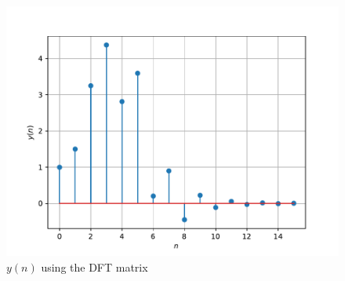 \documentclass[journal,12pt,twocolumn]{IEEEtran}
\begin{document}
\begin{figure}[!htb]
	\centering
	\includegraphics[width=\columnwidth]{figs/prob_6-5.pdf}
	\caption{$y(n)$ using the DFT matrix}
	\label{fig:yn-mtx}
\end{figure}
\end{document}
